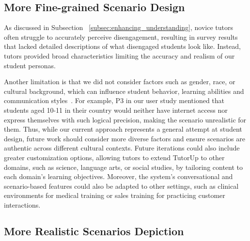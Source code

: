 \subsection{More Fine-grained Scenario Design}

As discussed in Subsection ~\ref{subsec:enhancing_understanding}, novice tutors often struggle to accurately perceive disengagement, resulting in survey results that lacked detailed descriptions of what disengaged students look like. Instead, tutors provided broad characteristics limiting the accuracy and realism of our student personas.

Another limitation is that we did not consider factors such as gender, race, or cultural background, which can influence student behavior, learning abilities and communication styles~\cite{lee23generative}. For example, P3 in our user study mentioned that students aged 10-11 in their country would neither have internet access nor express themselves with such logical precision, making the scenario unrealistic for them.
%
Thus, while our current approach represents a general attempt at student design, future work should consider more diverse factors and ensure scenarios are authentic across different cultural contexts. Future iterations could also include greater customization options, allowing tutors to extend TutorUp to other domains, such as science, language arts, or social studies, by tailoring content to each domain's learning objectives. Moreover, the system’s conversational and scenario-based features could also be adapted to other settings, such as clinical environments for medical training or sales training for practicing customer interactions.


\subsection{More Realistic Scenarios Depiction}

